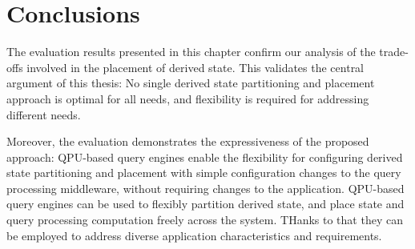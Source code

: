 \section{Conclusions}

The evaluation results presented in this chapter confirm our analysis of the trade-offs
involved in the placement of derived state.
This validates the central argument of this thesis:
No single derived state partitioning and placement approach is optimal for all needs,
and flexibility is required for addressing different needs.

Moreover, the evaluation demonstrates the expressiveness of the proposed approach:
QPU-based query engines enable the flexibility for configuring derived state partitioning and placement
with simple configuration changes to the query processing middleware, without requiring changes to the application.
QPU-based query engines can be used to flexibly partition derived state, and place state and query processing computation
freely across the system.
THanks to that they can be employed to address diverse application characteristics and requirements.
